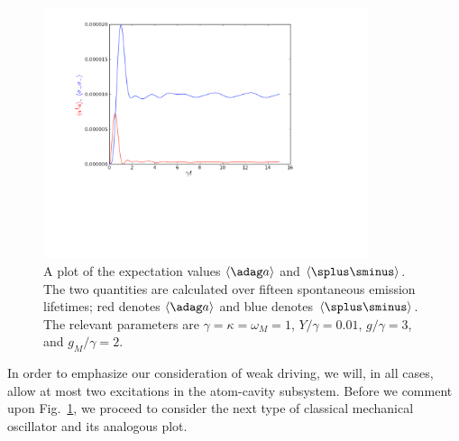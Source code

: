 \begin{figure}[htb]
\begin{center}
\includegraphics[width=0.85\textwidth]{Figures/3HarmonicPlots}
\caption[A plot of the expectation values $\langle \adag a \rangle$ and $\langle \splus\sminus \rangle$ for the harmonic oscillator]{\small{A plot of the expectation values $\langle \adag a \rangle$ and $\langle \splus\sminus \rangle$. The two quantities are calculated over fifteen spontaneous emission lifetimes; red denotes $\langle \adag a \rangle$ and blue denotes $\langle \splus\sminus \rangle$. The relevant parameters are $\gamma = \kappa = \omega_M = 1$, $Y/\gamma = 0.01$, $g/\gamma = 3$, and $g_M/\gamma = 2$.}}
\label{fig3Harmonic}
\end{center}
\end{figure}
%
In order to emphasize our consideration of weak driving, we will, in all cases, allow at most two excitations in the atom-cavity subsystem. Before we comment upon Fig.~\ref{fig3Harmonic}, we proceed to consider the next type of classical mechanical oscillator and its analogous plot.

